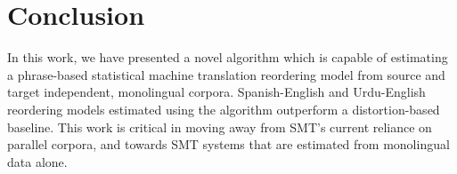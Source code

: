 \documentclass[11pt,letterpaper]{article}
\begin{document}
\section{Conclusion}
In this work, we have presented a novel algorithm which is capable of estimating a phrase-based statistical machine translation reordering model from source and target independent, monolingual corpora. Spanish-English and Urdu-English reordering models estimated using the algorithm outperform a distortion-based baseline. This work is critical in moving away from SMT's current reliance on parallel corpora, and towards SMT systems that are estimated from monolingual data alone. %



\vskip -0.25in



\end{document}
